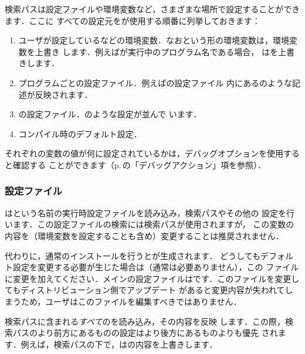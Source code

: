 \documentclass[uplatex,dvipdfmx,tombow]{jsarticle}
\begin{document}
検索パスは設定ファイルや環境変数など，さまざまな場所で設定することができます．ここに
すべての設定元を\KPS が使用する順番に列挙しておきます：
%
\begin{enumerate}
\item ユーザが設定しているなどの環境変数．なおという形の環境変数は，環境変数を上書き
  します．例えばが実行中のプログラム名である場合，%
  はを上書きします．
\item プログラムごとの設定ファイル．例えばの設定ファイル%
  内にあるのような記述が反映されます．
\item \KPS の設定ファイル．のような設定が並んで
  います．
\item コンパイル時のデフォルト設定．
\end{enumerate}
%
それぞれの変数の値が何に設定されているかは，デバッグオプションを使用すると確認する
ことができます（p.\,\pageref{sec:debugging}の「デバッグアクション」項を参照）．

\subsubsection{設定ファイル}

\KPS はという名前の実行時設定ファイルを読み込み，検索パスやその他の
設定を行います．この設定ファイルの検索には検索パスが使用されますが，
この変数の内容を（環境変数を設定することも含め）変更することは推奨されません．

代わりに，通常のインストールを行うとが生成されます．
どうしてもデフォルト設定を変更する必要が生じた場合は（通常は必要ありません），この
ファイルに変更を加えてください．メインの設定ファイルはです．このファイルを変更してもディストリビューション側でアップデート
があると変更内容が失われてしまうため，ユーザはこのファイルを編集すべきではありません．

\KPS 検索パスに含まれる\emph{すべて}のを読み込み，その内容を反映
します．この際，検索パスのより前方にあるものの設定はより後方にあるものよりも優先
されます．例えば，検索パスの下で，はの内容を上書きします．
\end{document}
